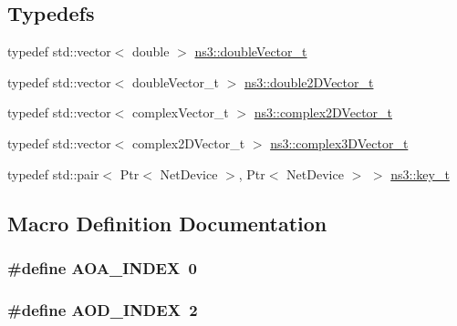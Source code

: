 \subsection*{Typedefs}
\begin{DoxyCompactItemize}
\item 
typedef std\+::vector$<$ double $>$ \hyperlink{namespacens3_aa6f1edf6566ca6afec613bc6e40240ea}{ns3\+::double\+Vector\+\_\+t}
\item 
typedef std\+::vector$<$ double\+Vector\+\_\+t $>$ \hyperlink{namespacens3_a908ae777c72964ccedbcf2310527a67e}{ns3\+::double2\+D\+Vector\+\_\+t}
\item 
typedef std\+::vector$<$ complex\+Vector\+\_\+t $>$ \hyperlink{namespacens3_aa25e3feece2676fd7470d50d4ba3d1d1}{ns3\+::complex2\+D\+Vector\+\_\+t}
\item 
typedef std\+::vector$<$ complex2\+D\+Vector\+\_\+t $>$ \hyperlink{namespacens3_afbc512ea4e4657e80b7ac44f78fc81ad}{ns3\+::complex3\+D\+Vector\+\_\+t}
\item 
typedef std\+::pair$<$ Ptr$<$ Net\+Device $>$, Ptr$<$ Net\+Device $>$ $>$ \hyperlink{namespacens3_aa42bd408e172586b3b192acfaa36b070}{ns3\+::key\+\_\+t}
\end{DoxyCompactItemize}


\subsection{Macro Definition Documentation}
\subsubsection[{\texorpdfstring{A\+O\+A\+\_\+\+I\+N\+D\+EX}{AOA_INDEX}}]{\setlength{\rightskip}{0pt plus 5cm}\#define A\+O\+A\+\_\+\+I\+N\+D\+EX~0}\hypertarget{mmwave-3gpp-channel_8h_a7f1d5772b72f2ce425d85a2b41e8842f}{}\label{mmwave-3gpp-channel_8h_a7f1d5772b72f2ce425d85a2b41e8842f}
\subsubsection[{\texorpdfstring{A\+O\+D\+\_\+\+I\+N\+D\+EX}{AOD_INDEX}}]{\setlength{\rightskip}{0pt plus 5cm}\#define A\+O\+D\+\_\+\+I\+N\+D\+EX~2}\hypertarget{mmwave-3gpp-channel_8h_af0ca9ddb9e3346bd827d865de86dc5cb}{}\label{mmwave-3gpp-channel_8h_af0ca9ddb9e3346bd827d865de86dc5cb}
